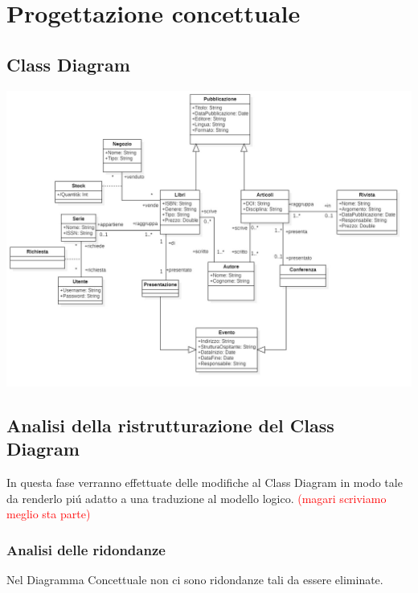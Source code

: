 \chapter{Progettazione concettuale}
    \section{Class Diagram}

    \includegraphics[scale=0.3]{Immagini/SchemaConcettuale.png}
        
    \section{Analisi della ristrutturazione del Class Diagram}
        In questa fase verranno effettuate delle modifiche al Class Diagram in modo tale da renderlo
        pi\'u adatto a una traduzione al modello logico. \textcolor{red}{(magari scriviamo meglio sta parte)}
        \subsection{Analisi delle ridondanze}
        Nel Diagramma Concettuale non ci sono ridondanze tali da essere eliminate.
